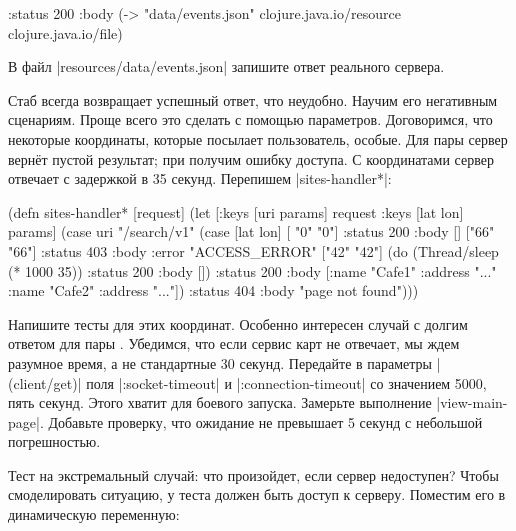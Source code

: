 
\begin{english}
  \begin{clojure}
{:status 200
 :body (-> "data/events.json"
           clojure.java.io/resource
           clojure.java.io/file)}
  \end{clojure}
\end{english}

\noindent
В файл \spverb|resources/data/events.json| запишите ответ реального сервера.


Стаб всегда возвращает успешный ответ, что неудобно. Научим его негативным
сценариям. Проще всего это сделать с помощью параметров. Договоримся, что
некоторые координаты, которые посылает пользователь, особые. Для пары
 сервер верн\"{е}т пустой результат; при  получим ошибку
доступа. С координатами  сервер отвечает с задержкой в 35
секунд. Перепишем \spverb|sites-handler*|:

\begin{english}
  \begin{clojure}
(defn sites-handler* [request]
  (let [{:keys [uri params]} request
        {:keys [lat lon]} params]
    (case uri
      "/search/v1"
      (case [lat lon]
        [ "0"  "0"] {:status 200 :body []}
        ["66" "66"] {:status 403 :body {:error "ACCESS_ERROR"}}
        ["42" "42"] (do (Thread/sleep (* 1000 35))
                        {:status 200 :body []})
        {:status 200
         :body [{:name "Cafe1" :address "..."}
                {:name "Cafe2" :address "..."}]})
      {:status 404 :body "page not found"})))
  \end{clojure}
\end{english}


Напишите тесты для этих координат. Особенно интересен случай с долгим ответом
для пары . Убедимся, что если сервис карт не отвечает, мы ждем
разумное время, а не стандартные 30 секунд. Передайте в параметры
\spverb|(client/get)| поля \spverb|:socket-timeout| и
\spverb|:connection-timeout| со значением 5000, пять секунд. Этого хватит для
боевого запуска. Замерьте выполнение \spverb|view-main-page|. Добавьте проверку,
что ожидание не превышает 5 секунд с небольшой погрешностью.

Тест на экстремальный случай: что произойдет, если сервер недоступен? Чтобы
смоделировать ситуацию, у теста должен быть доступ к серверу. Поместим его в
динамическую переменную:

